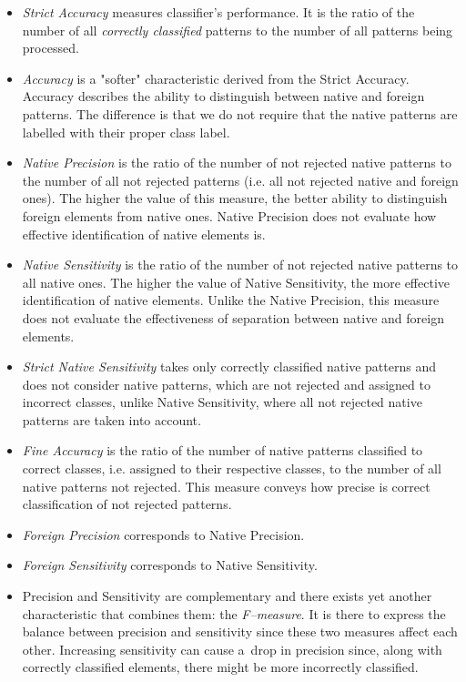 \documentclass{llncs}
\begin{document}
\begin{itemize}
  \item \emph{Strict Accuracy} measures classifier's performance. It is the ratio of the number of all \emph{correctly classified} patterns to the number of all patterns being processed.
  \item \emph{Accuracy} is a "softer" characteristic derived from the Strict Accuracy. Accuracy describes the ability to distinguish between native and foreign patterns. The difference is that we do not require that the native patterns are labelled with their proper class label.
  \item \emph{Native Precision} is the ratio of the number of not rejected native patterns to the number of all not rejected patterns (i.e. all not rejected native and foreign ones). The higher the value of this measure, the better ability to distinguish foreign elements from native ones. Native Precision does not evaluate how effective identification of native elements is.
  \item \emph{Native Sensitivity} is the ratio of the number of not rejected native patterns to all native ones. The higher the value of Native Sensitivity, the more effective identification of native elements. Unlike the Native Precision, this measure does not evaluate the effectiveness of separation between native and foreign elements.
  \item \emph{Strict Native Sensitivity} takes only correctly classified native patterns and does not consider native patterns, which are not rejected and assigned to incorrect classes, unlike Native Sensitivity, where all not rejected native patterns are taken into account.
  \item \emph{Fine Accuracy} is the ratio of the number of native patterns classified to correct classes, i.e. assigned to their respective classes, to the number of all native patterns not rejected. This measure conveys how precise is correct classification of not rejected patterns.
  \item \emph{Foreign Precision} corresponds to Native Precision.
  \item \emph{Foreign Sensitivity} corresponds to Native Sensitivity.
  \item  Precision and Sensitivity are complementary and there exists yet another characteristic that combines them: the \textit{F--measure}. It is there to express the balance between precision and sensitivity since these two measures affect each other. Increasing sensitivity can cause a~drop in precision since, along with correctly classified elements, there might be more incorrectly classified.
\end{itemize}
\end{document}
